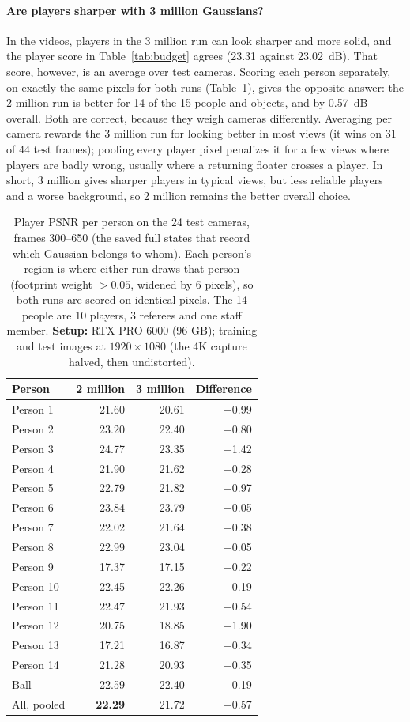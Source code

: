 \documentclass[11pt]{article}
\begin{document}
\paragraph{Are players sharper with 3 million Gaussians?} In the videos, players in the 3 million run
can look sharper and more solid, and the player score in Table~\ref{tab:budget} agrees (23.31 against
23.02~dB). That score, however, is an average over test cameras. Scoring each person separately, on
exactly the same pixels for both runs (Table~\ref{tab:per-player}), gives the opposite answer: the
2 million run is better for 14 of the 15 people and objects, and by 0.57~dB overall. Both are correct,
because they weigh cameras differently. Averaging per camera rewards the 3 million run for looking
better in most views (it wins on 31 of 44 test frames); pooling every player pixel penalizes it for
a few views where players are badly wrong, usually where a returning floater crosses a player. In
short, 3 million gives sharper players in typical views, but less reliable players and a worse
background, so 2 million remains the better overall choice.
\begin{table}[!htbp]\centering
\caption{Player PSNR per person on the 24 test cameras, frames 300--650 (the saved full states that
record which Gaussian belongs to whom). Each person's region is where either run draws that person
(footprint weight $>0.05$, widened by 6 pixels), so both runs are scored on identical pixels. The 14
people are 10 players, 3 referees and one staff member. \textbf{Setup:} RTX PRO 6000 (96 GB); training and test images at $1920\times1080$ (the 4K capture halved, then undistorted).}\label{tab:per-player}
\small\begin{tabular}{lrrr}\toprule
Person & 2 million & 3 million & Difference \\\midrule
Person 1 & 21.60 & 20.61 & $-$0.99 \\
Person 2 & 23.20 & 22.40 & $-$0.80 \\
Person 3 & 24.77 & 23.35 & $-$1.42 \\
Person 4 & 21.90 & 21.62 & $-$0.28 \\
Person 5 & 22.79 & 21.82 & $-$0.97 \\
Person 6 & 23.84 & 23.79 & $-$0.05 \\
Person 7 & 22.02 & 21.64 & $-$0.38 \\
Person 8 & 22.99 & 23.04 & +0.05 \\
Person 9 & 17.37 & 17.15 & $-$0.22 \\
Person 10 & 22.45 & 22.26 & $-$0.19 \\
Person 11 & 22.47 & 21.93 & $-$0.54 \\
Person 12 & 20.75 & 18.85 & $-$1.90 \\
Person 13 & 17.21 & 16.87 & $-$0.34 \\
Person 14 & 21.28 & 20.93 & $-$0.35 \\
Ball & 22.59 & 22.40 & $-$0.19 \\\midrule
All, pooled & \textbf{22.29} & 21.72 & $-$0.57 \\\bottomrule
\end{tabular}\end{table}
\end{document}
